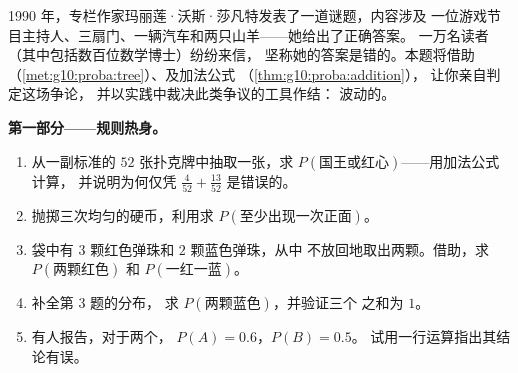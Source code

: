 \begin{problem}
\label{pb:g10:proba:1}
1990 年，专栏作家玛丽莲·沃斯·莎凡特发表了一道谜题，内容涉及
一位游戏节目主持人、三扇门、一辆汽车和两只山羊——她给出了正确答案。
一万名读者（其中包括数百位数学博士）纷纷来信，
坚称她的答案是错的。本题将借助
（\cref{met:g10:proba:tree}）、及加法公式
（\cref{thm:g10:proba:addition}），
让你亲自判定这场争论，
并以实践中裁决此类争议的工具作结：
波动的。

\medskip
\noindent\textbf{第一部分——规则热身。}
\begin{enumerate}
  \item 从一副标准的 $52$ 张扑克牌中抽取一张，求
        $P(\text{国王或红心})$——用加法公式计算，
        并说明为何仅凭 $\frac{4}{52} + \frac{13}{52}$
        是错误的。
  \item 抛掷三次均匀的硬币，利用求
        $P(\text{至少出现一次正面})$。
  \item 袋中有 $3$ 颗红色弹珠和 $2$ 颗蓝色弹珠，从中
        不放回地取出两颗。借助，求
        $P(\text{两颗红色})$ 和 $P(\text{一红一蓝})$。
  \item 补全第 3 题的分布，
        求 $P(\text{两颗蓝色})$，并验证三个
        之和为 $1$。
  \item 有人报告，对于两个\emph{}，
        $P(A) = 0.6$，$P(B) = 0.5$。
        试用一行运算指出其结论有误。
\end{enumerate}


\end{problem}
